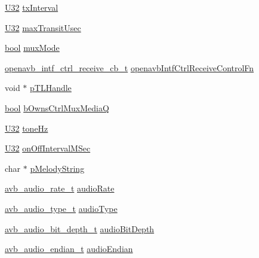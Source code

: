 \begin{DoxyCompactItemize}
\hyperlink{openavb__types__base__pub_8h_a696390429f2f3b644bde8d0322a24124}{U32} \hyperlink{structpvt__data__t_abb67a593d59c479e632685a33c092a32}{tx\+Interval}
\item 
\hyperlink{openavb__types__base__pub_8h_a696390429f2f3b644bde8d0322a24124}{U32} \hyperlink{structpvt__data__t_a3838a4b3ace56e06dc76c5b13f1df3ff}{max\+Transit\+Usec}
\item 
\hyperlink{avb__gptp_8h_af6a258d8f3ee5206d682d799316314b1}{bool} \hyperlink{structpvt__data__t_ae65ed8a522032060bb4b0f64cb4a99f0}{mux\+Mode}
\item 
\hyperlink{intf__ctrl_2openavb__intf__ctrl__pub_8h_a2f4682a83487bf2de2e3f61dcd368081}{openavb\+\_\+intf\+\_\+ctrl\+\_\+receive\+\_\+cb\+\_\+t} \hyperlink{structpvt__data__t_ae7693bd2f52c765ed9ffc87f5b19db5e}{openavb\+Intf\+Ctrl\+Receive\+Control\+Fn}
\item 
void $\ast$ \hyperlink{structpvt__data__t_a17bf97c9962379fa3092579f846a007e}{p\+T\+L\+Handle}
\item 
\hyperlink{avb__gptp_8h_af6a258d8f3ee5206d682d799316314b1}{bool} \hyperlink{structpvt__data__t_a0577d9d9a83d003c677892565339cd6e}{b\+Owns\+Ctrl\+Mux\+MediaQ}
\item 
\hyperlink{openavb__types__base__pub_8h_a696390429f2f3b644bde8d0322a24124}{U32} \hyperlink{structpvt__data__t_a96e806731a7839f056148b8e0d11d167}{tone\+Hz}
\item 
\hyperlink{openavb__types__base__pub_8h_a696390429f2f3b644bde8d0322a24124}{U32} \hyperlink{structpvt__data__t_a81da92af9cf46efd1630f7ec1329759f}{on\+Off\+Interval\+M\+Sec}
\item 
char $\ast$ \hyperlink{structpvt__data__t_a304e613c569011f1202e4a95ae5f5372}{p\+Melody\+String}
\item 
\hyperlink{openavb__audio__pub_8h_a6070f1cfbb6824de6f0b2524cd306903}{avb\+\_\+audio\+\_\+rate\+\_\+t} \hyperlink{structpvt__data__t_a98636b12c3c9cafdc6992d03d6f86852}{audio\+Rate}
\item 
\hyperlink{openavb__audio__pub_8h_a680efa0db2b29a63c5a0e8f11975682f}{avb\+\_\+audio\+\_\+type\+\_\+t} \hyperlink{structpvt__data__t_abc6ed39d478764b05a886d64d104ce4b}{audio\+Type}
\item 
\hyperlink{openavb__audio__pub_8h_ae64ee32f6ac9a6b2cf607f46ee4160bd}{avb\+\_\+audio\+\_\+bit\+\_\+depth\+\_\+t} \hyperlink{structpvt__data__t_a868321a19830c5c46ed52c007dfdedb9}{audio\+Bit\+Depth}
\item 
\hyperlink{openavb__audio__pub_8h_a945c53b1886540f6c50d0720b3befc23}{avb\+\_\+audio\+\_\+endian\+\_\+t} \hyperlink{structpvt__data__t_a2737fc6ab5107802c9fa03d74c967794}{audio\+Endian}

\end{DoxyCompactItemize}
